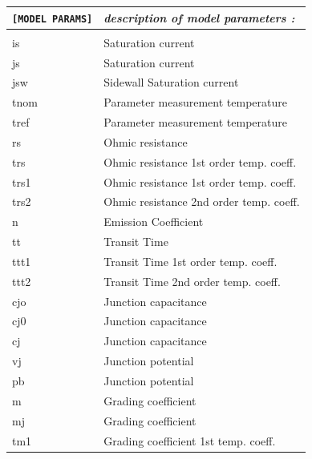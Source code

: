 \begin{longtable}{l l}		
\texttt{[MODEL PARAMS]} & \textit{description of model parameters :} \\ \hline \\ \vspace{-0.8\parskip}
																					{\small is} & {\small Saturation current} \\
																					{\small js} & {\small Saturation current} \\
																					{\small jsw} & {\small Sidewall Saturation current} \\
																					{\small tnom} & {\small Parameter measurement temperature} \\
																					{\small tref} & {\small Parameter measurement temperature} \\
																					{\small rs} & {\small Ohmic resistance} \\
																					{\small trs} & {\small Ohmic resistance 1st order temp. coeff.} \\
																					{\small trs1} & {\small Ohmic resistance 1st order temp. coeff.} \\
																					{\small trs2} & {\small Ohmic resistance 2nd order temp. coeff.} \\
																					{\small n} & {\small Emission Coefficient} \\
																					{\small tt} & {\small Transit Time} \\
																					{\small ttt1} & {\small Transit Time 1st order temp. coeff.} \\
																					{\small ttt2} & {\small Transit Time 2nd order temp. coeff.} \\
																					{\small cjo} & {\small Junction capacitance} \\
																					{\small cj0} & {\small Junction capacitance} \\
																					{\small cj} & {\small Junction capacitance} \\
																					{\small vj} & {\small Junction potential} \\
																					{\small pb} & {\small Junction potential} \\
																					{\small m} & {\small Grading coefficient} \\
																					{\small mj} & {\small Grading coefficient} \\
																					{\small tm1} & {\small Grading coefficient 1st temp. coeff.} \\

\end{longtable}
